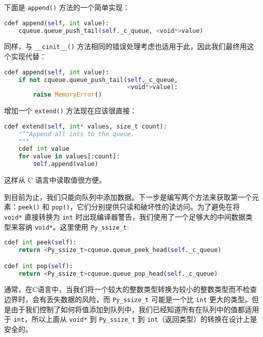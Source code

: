 \begin{translation}
下面是 \lstinline{append()} 方法的一个简单实现：

\begin{framed}
\begin{lstlisting}[language=python]
cdef append(self, int value):
    cqueue.queue_push_tail(self._c_queue, <void*>value)
\end{lstlisting}
\end{framed}

同样，与 \lstinline{__cinit__()} 方法相同的错误处理考虑也适用于此，因此我们最终用这个实现代替：

\begin{framed}
\begin{lstlisting}[language=python]
cdef append(self, int value):
    if not cqueue.queue_push_tail(self._c_queue,
                                  <void*>value):
        raise MemoryError()
\end{lstlisting}
\end{framed}

增加一个 \lstinline{extend()} 方法现在应该很直接：

\begin{framed}
\begin{lstlisting}[language=python]
cdef extend(self, int* values, size_t count):
    """Append all ints to the queue.
    """
    cdef int value
    for value in values[:count]:
        self.append(value)
\end{lstlisting}
\end{framed}这样从 C 语言中读取值很方便。

到目前为止，我们只能向队列中添加数据。下一步是编写两个方法来获取第一个元素：\lstinline{peek()} 和 \lstinline{pop()}，它们分别提供只读和破坏性的读访问。为了避免在将 \lstinline{void*} 直接转换为 \lstinline{int} 时出现编译器警告，我们使用了一个足够大的中间数据类型来容纳 \lstinline{void*}。这里使用 \lstinline{Py_ssize_t}:

\begin{framed}
\begin{lstlisting}[language=python]
cdef int peek(self):
    return <Py_ssize_t>cqueue.queue_peek_head(self._c_queue)

cdef int pop(self):
    return <Py_ssize_t>cqueue.queue_pop_head(self._c_queue)
\end{lstlisting}
\end{framed}

通常，在C语言中，当我们将一个较大的整数类型转换为较小的整数类型而不检查边界时，会有丢失数据的风险，而 \lstinline{Py_ssize_t} 可能是一个比 \lstinline{int} 更大的类型。但是由于我们控制了如何将值添加到队列中，我们已经知道所有在队列中的值都适用于 \lstinline{int}，所以上面从 \lstinline{void*} 到 \lstinline{Py_ssize_t} 到 \lstinline{int}（返回类型）的转换在设计上是安全的。


\end{translation}

